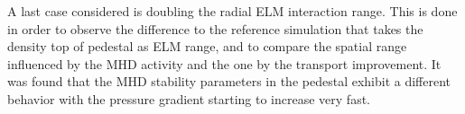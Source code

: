 A last case considered is doubling the radial ELM interaction range. This is done in order to observe the difference to the reference simulation that takes the density top of pedestal as ELM range, and to compare the spatial range influenced by the MHD activity and the one by the transport improvement. It was found that the MHD stability parameters in the pedestal exhibit a different behavior with the pressure gradient starting to increase very fast.
